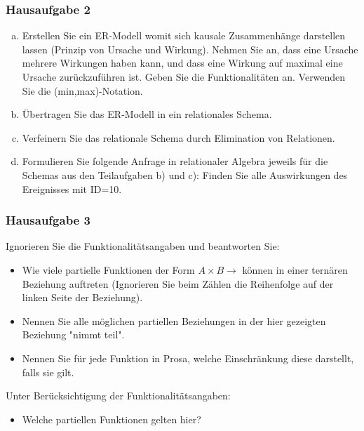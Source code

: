 \begin{frame}
	\frametitle{Hausaufgabe 2}
	\vspace{0.5cm}

	\begin{enumerate}[(a)]
		\item Erstellen Sie ein ER-Modell womit sich kausale Zusammenhänge
		      darstellen lassen (Prinzip von Ursache und Wirkung).
		      Nehmen Sie an, dass eine Ursache mehrere Wirkungen haben kann,
		      und dass eine Wirkung auf maximal eine Ursache zurückzuführen ist.
		      Geben Sie die Funktionalitäten an. Verwenden Sie die (min,max)-Notation.
		\item Übertragen Sie das ER-Modell in ein relationales Schema.
		\item Verfeinern Sie das relationale Schema durch Elimination von Relationen.
		\item Formulieren Sie folgende Anfrage in relationaler Algebra jeweils für die Schemas
		      aus den Teilaufgaben b) und c): Finden Sie alle Auswirkungen des Ereignisses mit ID=10.
	\end{enumerate}
\end{frame}

\begin{frame}
	\frametitle{Hausaufgabe 3}
	\vspace{0.5cm}

	Ignorieren Sie die Funktionalitätsangaben und beantworten Sie:
	\begin{itemize}
		\item Wie viele partielle Funktionen der Form \( A \times B \rightarrow \)
		      können in einer ternären Beziehung auftreten
		      (Ignorieren Sie beim Zählen die Reihenfolge auf der linken Seite der Beziehung).
		\item Nennen Sie alle möglichen partiellen Beziehungen in der hier
		      gezeigten Beziehung "nimmt teil".
		\item Nennen Sie für jede Funktion in Prosa,
		      welche Einschränkung diese darstellt, falls sie gilt.
	\end{itemize}
	Unter Berücksichtigung der Funktionalitätsangaben:
	\begin{itemize}
		\item Welche partiellen Funktionen gelten hier?
	\end{itemize}
\end{frame}


